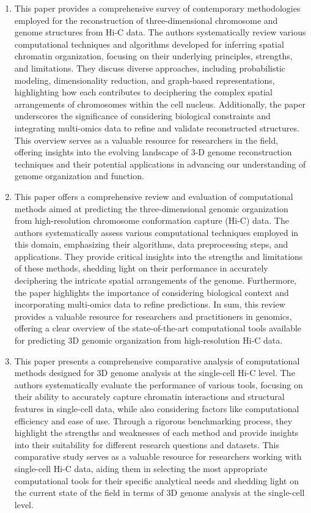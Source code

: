 \begin{enumerate}
    \item This paper provides a comprehensive survey of contemporary methodologies employed for the reconstruction of three-dimensional chromosome and genome structures from Hi-C data. The authors systematically review various computational techniques and algorithms developed for inferring spatial chromatin organization, focusing on their underlying principles, strengths, and limitations. They discuss diverse approaches, including probabilistic modeling, dimensionality reduction, and graph-based representations, highlighting how each contributes to deciphering the complex spatial arrangements of chromosomes within the cell nucleus. Additionally, the paper underscores the significance of considering biological constraints and integrating multi-omics data to refine and validate reconstructed structures. This overview serves as a valuable resource for researchers in the field, offering insights into the evolving landscape of 3-D genome reconstruction techniques and their potential applications in advancing our understanding of genome organization and function.
    \item This paper offers a comprehensive review and evaluation of computational methods aimed at predicting the three-dimensional genomic organization from high-resolution chromosome conformation capture (Hi-C) data. The authors systematically assess various computational techniques employed in this domain, emphasizing their algorithms, data preprocessing steps, and applications. They provide critical insights into the strengths and limitations of these methods, shedding light on their performance in accurately deciphering the intricate spatial arrangements of the genome. Furthermore, the paper highlights the importance of considering biological context and incorporating multi-omics data to refine predictions. In sum, this review provides a valuable resource for researchers and practitioners in genomics, offering a clear overview of the state-of-the-art computational tools available for predicting 3D genomic organization from high-resolution Hi-C data.
    \item This paper presents a comprehensive comparative analysis of computational methods designed for 3D genome analysis at the single-cell Hi-C level. The authors systematically evaluate the performance of various tools, focusing on their ability to accurately capture chromatin interactions and structural features in single-cell data, while also considering factors like computational efficiency and ease of use. Through a rigorous benchmarking process, they highlight the strengths and weaknesses of each method and provide insights into their suitability for different research questions and datasets. This comparative study serves as a valuable resource for researchers working with single-cell Hi-C data, aiding them in selecting the most appropriate computational tools for their specific analytical needs and shedding light on the current state of the field in terms of 3D genome analysis at the single-cell level.

\end{enumerate}
